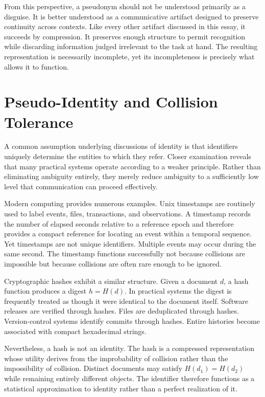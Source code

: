 \documentclass[11pt]{article}
\theoremstyle{plain}
\begin{document}
From this perspective, a pseudonym should not be understood primarily as a disguise. It is better understood as a communicative artifact designed to preserve continuity across contexts. Like every other artifact discussed in this essay, it succeeds by compression. It preserves enough structure to permit recognition while discarding information judged irrelevant to the task at hand. The resulting representation is necessarily incomplete, yet its incompleteness is precisely what allows it to function.

\section{Pseudo-Identity and Collision Tolerance}

A common assumption underlying discussions of identity is that identifiers uniquely determine the entities to which they refer. Closer examination reveals that many practical systems operate according to a weaker principle. Rather than eliminating ambiguity entirely, they merely reduce ambiguity to a sufficiently low level that communication can proceed effectively.

Modern computing provides numerous examples. Unix timestamps are routinely used to label events, files, transactions, and observations. A timestamp records the number of elapsed seconds relative to a reference epoch and therefore provides a compact reference for locating an event within a temporal sequence. Yet timestamps are not unique identifiers. Multiple events may occur during the same second. The timestamp functions successfully not because collisions are impossible but because collisions are often rare enough to be ignored.

Cryptographic hashes exhibit a similar structure. Given a document $d$, a hash function produces a digest $h = H(d)$. In practical systems the digest is frequently treated as though it were identical to the document itself. Software releases are verified through hashes. Files are deduplicated through hashes. Version-control systems identify commits through hashes. Entire histories become associated with compact hexadecimal strings.

Nevertheless, a hash is not an identity. The hash is a compressed representation whose utility derives from the improbability of collision rather than the impossibility of collision. Distinct documents may satisfy $H(d_1)=H(d_2)$ while remaining entirely different objects. The identifier therefore functions as a statistical approximation to identity rather than a perfect realization of it.
\end{document}
